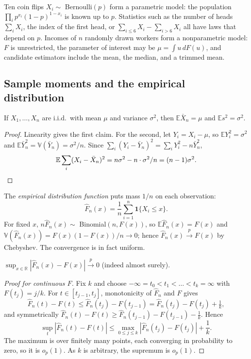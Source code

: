 \documentclass[11pt,a4paper]{article}
\newcommand{\E}{\mathbb{E}}
\newcommand{\V}{\mathbb{V}}
\newcommand{\R}{\mathbb{R}}
\newcommand{\cp}{\xrightarrow{\;p\;}}
\newcommand{\op}{o_p}
\newcommand{\iid}{i.i.d.}
\newcommand{\one}{\mathbf 1}
\newcommand{\Xbar}{\bar X_n}
\newcommand{\Fn}{\widehat F_n}
\begin{document}
\begin{example}
Ten coin flips $X_i\sim$ Bernoulli$(p)$ form a parametric model: the population $\prod_ip^{x_i}(1-p)^{1-x_i}$ is known up to $p$. Statistics such as the number of heads $\sum_iX_i$, the index of the first head, or $\sum_{i\le6}X_i-\sum_{i>6}X_i$ all have laws that depend on $p$. Incomes of $n$ randomly drawn workers form a nonparametric model: $F$ is unrestricted, the parameter of interest may be $\mu=\int u\,dF(u)$, and candidate estimators include the mean, the median, and a trimmed mean.
\end{example}

\subsection{Sample moments and the empirical distribution}

\begin{lemma}\label{lem:unbiased}
If $X_1,\ldots,X_n$ are \iid\ with mean $\mu$ and variance $\sigma^2$, then $\E\Xbar=\mu$ and $\E s^2=\sigma^2$.
\end{lemma}

\begin{proof}
Linearity gives the first claim. For the second, let $Y_i=X_i-\mu$, so $\E Y_i^2=\sigma^2$ and $\E\bar Y_n^2=\V(\bar Y_n)=\sigma^2/n$. Since $\sum_i(Y_i-\bar Y_n)^2=\sum_iY_i^2-n\bar Y_n^2$,
\[
\E\sum_i(X_i-\Xbar)^2=n\sigma^2-n\cdot\sigma^2/n=(n-1)\sigma^2 .\qedhere
\]
\end{proof}

The \emph{empirical distribution function} puts mass $1/n$ on each observation:
\[
\Fn(x)=\frac1n\sum_{i=1}^n\one\{X_i\le x\}.
\]
For fixed $x$, $n\Fn(x)\sim$ Binomial$(n,F(x))$, so $\E\Fn(x)=F(x)$ and $\V(\Fn(x))=F(x)(1-F(x))/n\to0$; hence $\Fn(x)\cp F(x)$ by Chebyshev. The convergence is in fact uniform.

\begin{theorem}\label{thm:gc}
$\sup_{x\in\R}|\Fn(x)-F(x)|\cp0$ \textup{(}indeed almost surely\textup{)}.
\end{theorem}

\begin{proof}[Proof for continuous $F$]
Fix $k$ and choose $-\infty=t_0<t_1<\dots<t_k=\infty$ with $F(t_j)=j/k$. For $t\in[t_{j-1},t_j]$, monotonicity of $\Fn$ and $F$ gives
\[
\Fn(t)-F(t)\le\Fn(t_j)-F(t_{j-1})=\Fn(t_j)-F(t_j)+\tfrac1k,
\]
and symmetrically $\Fn(t)-F(t)\ge\Fn(t_{j-1})-F(t_{j-1})-\frac1k$. Hence
\[
\sup_t|\Fn(t)-F(t)|\le\max_{0\le j\le k}|\Fn(t_j)-F(t_j)|+\frac1k .
\] The maximum is over finitely many points, each converging in probability to zero, so it is $\op(1)$. As $k$ is arbitrary, the supremum is $\op(1)$.
\end{proof}
\end{document}

